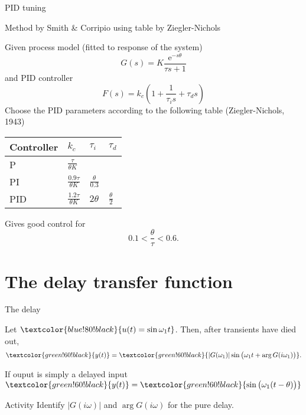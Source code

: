 \documentclass[presentation,aspectratio=169, usenames, dvipsnames]{beamer}
\def\ucolor{blue!80!black}
\def\ycolor{green!60!black}
\newcommand*{\incolor}[1]{\textcolor{\ucolor}{#1}}
\newcommand*{\outcolor}[1]{\textcolor{\ycolor}{#1}}
\begin{document}
\begin{frame}[label={sec:orga627a77}]{PID tuning}
\end{frame}
\begin{frame}[label={sec:org563c1a5}]{Method by Smith \& Corripio using table by Ziegler-Nichols}
\small

Given process model (fitted to response of the system) \[ G(s) = K \frac{\mathrm{e}^{-s\theta}}{\tau s + 1} \] and PID controller
   \[ F(s) = k_c\left( 1 + \frac{1}{\tau_i s} + \tau_d s\right) \]
   Choose the PID parameters according to the following table (Ziegler-Nichols, 1943)
   \begin{center}
   \setlength{\tabcolsep}{20pt}
   \renewcommand{\arraystretch}{1.5}
   \begin{tabular}{llll}
   Controller & \(k_c\) & \(\tau_i\) & \(\tau_d\)\\
  \hline\hline
  P & \(\frac{\tau}{\theta K}\) &  & \\
  PI & \(\frac{0.9\tau}{\theta K}\) & \(\frac{\theta}{0.3}\) & \\
  PID & \(\frac{1.2\tau}{\theta K}\) & \(2\theta\) & \(\frac{\theta}{2}\)\\
  \hline
\end{tabular}
\end{center}

Gives good control for \[0.1 < \frac{\theta}{\tau} < 0.6.\]
\end{frame}


\section{The delay transfer function}
\label{sec:org7b18888}

\begin{frame}[label={sec:orgbba4a3d}]{The delay}
\begin{center}
\end{center}

Let \(\incolor{u(t) = \sin\omega_1 t}\). Then, after transients have died out,
\[ \outcolor{y(t)}= \outcolor{|G(\omega_1)| \sin \big( \omega_1 t + \arg G(i\omega_1)\big)}. \]

\pause
\alert{If ouput is simply a delayed input} \(\outcolor{y(t)}= \outcolor{ \sin \big( \omega_1 (t - \theta) \big)}\)

\pause
\alert{Activity} 
Identify \(|G(i\omega)|\) and \(\arg G(i\omega)\) for the pure delay.
\end{frame}
\end{document}
